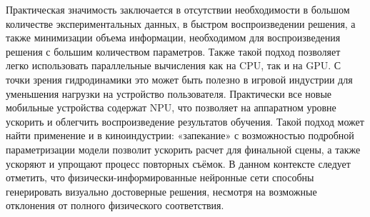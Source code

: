 Практическая значимость заключается в отсутствии необходимости в большом количестве
экспериментальных данных, в быстром воспроизведении решения, а также минимизации
объема информации, необходимом для воспроизведения решения с большим количеством
параметров. Также такой подход позволяет легко использовать параллельные вычисления
как на CPU, так и на GPU. С точки зрения гидродинамики это может быть полезно в игровой индустрии
для уменьшения нагрузки на устройство пользователя. Практически все новые мобильные
устройства содержат NPU, что позволяет на аппаратном уровне ускорить и облегчить
воспроизведение результатов обучения. Такой подход может найти применение и в 
киноиндустрии: «запекание» с возможностью подробной параметризации модели позволит
ускорить расчет для финальной сцены, а также ускоряют и упрощают процесс повторных съёмок.
В данном контексте следует отметить, что физически-информированные нейронные сети способны
генерировать визуально достоверные решения, несмотря на возможные отклонения от полного
физического соответствия.
